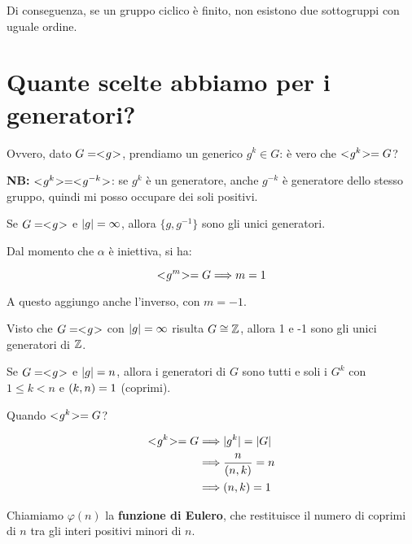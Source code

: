 Di conseguenza, se un gruppo ciclico è finito, non esistono due sottogruppi con uguale ordine.

\section{Quante scelte abbiamo per i generatori?}

Ovvero, dato $G = < \negmedspace g \negmedspace >$, prendiamo un generico $g^k \in G$: è vero che $< \negmedspace g^k \negmedspace > = G$?

\textbf{NB: } $< \negmedspace g^k \negmedspace > = < \negmedspace g^{-k} \negmedspace >$: se $g^k$ è un generatore, anche $g^{-k}$ è generatore dello stesso gruppo, quindi mi posso occupare dei soli positivi.

\begin{teorema}
	\label{thr:generatori_gruppi_ciclici_infiniti}
	Se $G = < \negmedspace g \negmedspace >$ e $\lvert g \rvert = \infty$, allora $\{g, g^{-1}\}$ sono gli unici generatori.
\end{teorema}
\begin{dimostrazione}
	Dal momento che $\alpha$ è iniettiva, si ha:
	
	\begin{equation}
		< \negmedspace g^m \negmedspace > = G \Longrightarrow m = 1
	\end{equation} 

	A questo aggiungo anche l'inverso, con $m = -1$.
\end{dimostrazione}

Visto che $G=< \negmedspace g \negmedspace >$ con $\lvert g \rvert = \infty$ risulta $G \cong \mathbb{Z}$, allora 1 e -1 sono gli unici generatori di $\mathbb{Z}$.

\begin{teorema}
	\label{thr:generatori_gruppi_ciclici_finiti}
	Se $G = < \negmedspace g \negmedspace >$ e $\lvert g \rvert = n$, allora i generatori di $G$ sono tutti e soli i $G^k$ con $1 \le k < n$ e $ ( k , n )  = 1$ (coprimi).
\end{teorema}
\begin{dimostrazione}
	Quando $< \negmedspace g^k \negmedspace > = G$?
	
	\begin{align}
		< \negmedspace g^k \negmedspace > = G &\Longrightarrow \lvert g^k \rvert = \lvert G \rvert \\
		&\Longrightarrow \dfrac{n}{ ( n , k ) } = n \\
		&\Longrightarrow  ( n , k )  = 1
	\end{align}
\end{dimostrazione}

Chiamiamo $\varphi(n)$ la \textbf{funzione di Eulero}, che restituisce il numero di coprimi di $n$ tra gli interi positivi minori di $n$.

